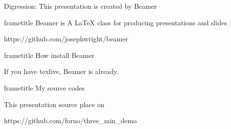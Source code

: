 \begin{frame}[plain,t]
  {Digression: This presentation is created by Beamer}

  \begin{beamercolorbox}[rounded=true, center, shadow=true,wd=\linewidth]{frametitle}
    Beamer is A LaTeX class for producing presentations and slides
  \end{beamercolorbox}
  https://github.com/josephwright/beamer

  \begin{beamercolorbox}[rounded=true, center, shadow=true,wd=\linewidth]{frametitle}
    How install Beamer
  \end{beamercolorbox}
  If you have texlive, Beamer is already.

  \begin{beamercolorbox}[rounded=true, center, shadow=true,wd=\linewidth]{frametitle}
    My source codes
  \end{beamercolorbox}

  This presentation source place on
  
  https://github.com/forno/three\_min\_demo


\end{frame}

